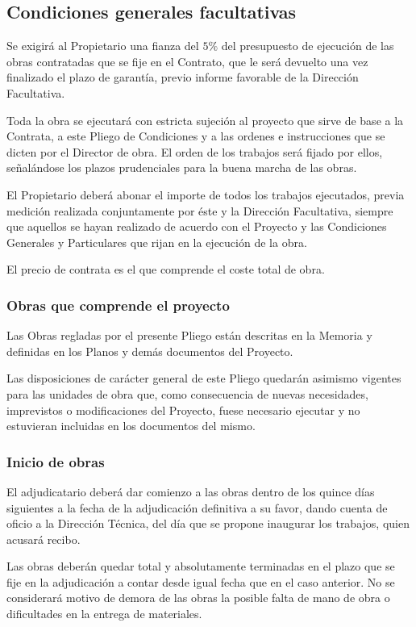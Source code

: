\documentclass[../main.tex]{subfiles}
\begin{document}
\subsection{Condiciones generales facultativas}
Se exigirá al Propietario una fianza del $5 \%$ del presupuesto de ejecución de las obras contratadas que se fije en el Contrato, que le será devuelto una vez finalizado el plazo de garantía, previo informe favorable de la Dirección Facultativa. \par
\vspace{0.5 cm}
Toda la obra se ejecutará con estricta sujeción al proyecto que sirve de base a la Contrata, a este Pliego de Condiciones y a las ordenes e instrucciones que se dicten por el Director de obra. El orden de los trabajos será fijado por ellos, señalándose los plazos prudenciales para la buena marcha de las obras. \par
\vspace{0.5 cm}
El Propietario deberá abonar el importe de todos los trabajos ejecutados, previa medición realizada conjuntamente por éste y la Dirección Facultativa, siempre que aquellos se hayan realizado de acuerdo con el Proyecto y las Condiciones Generales y Particulares que rijan en la ejecución de la obra. \par
\vspace{0.5 cm}
El precio de contrata es el que comprende el coste total de obra.

\subsubsection{Obras que comprende el proyecto}
Las Obras regladas por el presente Pliego están descritas en la Memoria y definidas en los Planos y demás documentos del Proyecto. \par
\vspace{0.5 cm}
Las disposiciones de carácter general de este Pliego quedarán asimismo vigentes para las unidades de obra que, como consecuencia de nuevas necesidades, imprevistos o modificaciones del Proyecto, fuese necesario ejecutar y no estuvieran incluidas en los documentos del mismo.

\subsubsection{Inicio de obras}
El adjudicatario deberá dar comienzo a las obras dentro de los quince días siguientes a la fecha de la adjudicación definitiva a su favor, dando cuenta de oficio a la Dirección Técnica, del día que se propone inaugurar los trabajos, quien acusará recibo. \par
\vspace{0.5 cm}
Las obras deberán quedar total y absolutamente terminadas en el plazo que se fije en la adjudicación a contar desde igual fecha que en el caso anterior. No se considerará motivo de demora de las obras la posible falta de mano de obra o dificultades en la entrega de materiales.
\end{document}
